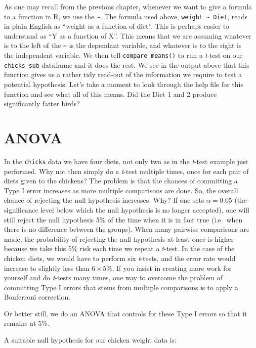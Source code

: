 \documentclass[english,10pt,a4paper,oneside]{book}
\theoremstyle{definition}
\theoremstyle{definition}
\theoremstyle{definition}
\theoremstyle{remark}
\begin{document}
As one may recall from the previous chapter, whenever we want to give a
formula to a function in R, we use the \texttt{\textasciitilde{}}. The
formula used above, \texttt{weight\ \textasciitilde{}\ Diet}, reads in
plain English as \enquote{weight as a function of diet}. This is perhaps
easier to understand as \enquote{Y as a function of X}. This means that
we are assuming whatever is to the left of the
\texttt{\textasciitilde{}} is the dependant variable, and whatever is to
the right is the independent variable. We then tell
\texttt{compare\_means()} to run a \emph{t}-test on our
\texttt{chicks\_sub} dataframe and it does the rest. We see in the
output above that this function gives us a rather tidy read-out of the
information we require to test a potential hypothesis. Let's take a
moment to look through the help file for this function and see what all
of this means. Did the Diet 1 and 2 produce significantly fatter birds?

\section{ANOVA}\label{anova-1}

In the \texttt{chicks} data we have four diets, not only two as in the
\emph{t}-test example just performed. Why not then simply do a
\emph{t}-test multiple times, once for each pair of diets given to the
chickens? The problem is that the chances of committing a Type I error
increases as more multiple comparisons are done. So, the overall chance
of rejecting the null hypothesis increases. Why? If one sets
\(\alpha=0.05\) (the significance level below which the null hypothesis
is no longer accepted), one will still reject the null hypothesis 5\% of
the time when it is in fact true (i.e.~when there is no difference
between the groups). When many pairwise comparisons are made, the
probability of rejecting the null hypothesis at least once is higher
because we take this 5\% risk each time we repeat a \emph{t}-test. In
the case of the chicken diets, we would have to perform six
\emph{t}-tests, and the error rate would increase to slightly less than
\(6\times5\%\). If you insist in creating more work for yourself and do
\emph{t}-tests many times, one way to overcome the problem of committing
Type I errors that stems from multiple comparisons is to apply a
Bonferroni correction.

Or better still, we do an ANOVA that controls for these Type I errors so
that it remains at 5\%.

A suitable null hypothesis for our chicken weight data is:
\end{document}
